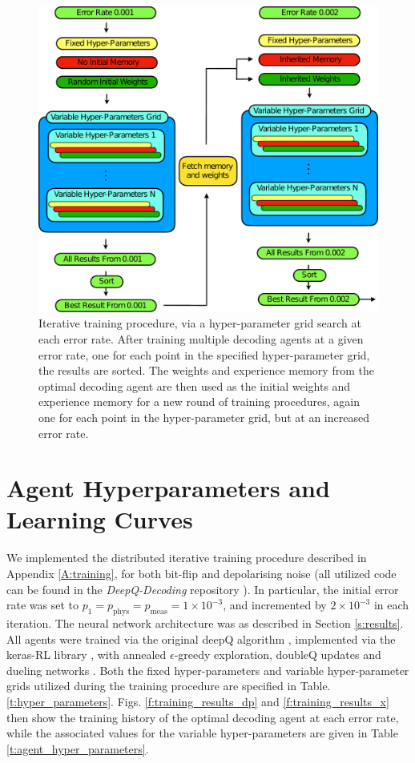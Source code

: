 \documentclass[twocolumn,preprintnumbers,amsmath,amssymb,notitlepage,nofootinbib,longbibliography,superscriptaddress,aps,pra,10pt]{revtex4-1}
\begin{document}
	\begin{figure}
		\centering
		\includegraphics[width=\linewidth]{figures/iterative_training.pdf}
		\caption{Iterative training procedure, via a hyper-parameter grid search at each error rate. After training multiple decoding agents at a given error rate, one for each point in the specified hyper-parameter grid, the results are sorted. The weights and experience memory from the optimal decoding agent are then used as the initial weights and experience memory for a new round of training procedures, again one for each point in the hyper-parameter grid, but at an increased error rate.}\label{f:iterative_training}
	\end{figure}

\section{Agent Hyperparameters and Learning Curves}\label{A:parameters}

	We implemented the distributed iterative training procedure described in Appendix \ref{A:training}, for both bit-flip and depolarising noise (all utilized code can be found in the \emph{DeepQ-Decoding} repository \cite{DeepQDecoding}).
	In particular, the initial error rate was set to $p_1 = p_{\mathrm{phys}} = p_{\mathrm{meas}} = 1\times10^{-3}$, and incremented by $2\times10^{-3}$ in each iteration.
	The neural network architecture was as described in Section \ref{s:results}.
	All agents were trained via the original deepQ algorithm \cite{RLMnih15}, implemented via the keras-RL library \cite{plappert2016kerasrl}, with annealed $\epsilon$-greedy exploration, doubleQ updates \cite{RLvan2016deep} and dueling networks \cite{RLvan2016deep}.
	Both the fixed hyper-parameters and variable hyper-parameter grids utilized during the training procedure are specified in Table. \ref{t:hyper_parameters}.
	Figs. \ref{f:training_results_dp} and \ref{f:training_results_x} then show the training history of the optimal decoding agent at each error rate, while the associated values for the variable hyper-parameters are given in Table \ref{t:agent_hyper_parameters}.
\end{document}
